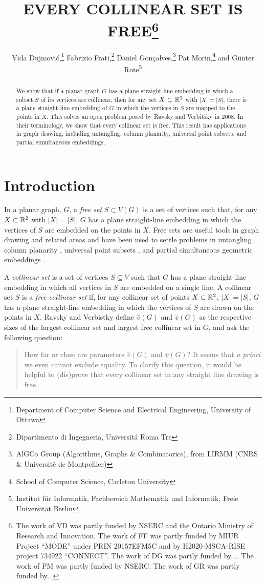 \documentclass{patmorin}
\title{\MakeUppercase{Every Collinear Set is Free}\thanks{%
The work of VD was partly funded by NSERC and the Ontario Ministry of Research and Innovation.
The work of FF was partly funded by MIUR Project “MODE” under PRIN 20157EFM5C and by H2020-MSCA-RISE project 734922 “CONNECT”.
The work of DG was partly funded by....
The work of PM was partly funded by NSERC.
The work of GR was partly funded by...
}}
\author{Vida Dujmović,\thanks{Department of Computer Science and Electrical Engineering, University of Ottawa}\quad
      Fabrizio Frati,\thanks{Dipartimento di Ingegneria,
Universit\'a Roma Tre}\quad
      Daniel Gonçalves,\thanks{AlGCo Group (Algorithms, Graphs \& Combinatorics), from LIRMM (CNRS \& Université de Montpellier)}\quad 
      Pat Morin,\thanks{School of Computer Science, Carleton University}\quad
      and Günter Rote\thanks{Institut für Informatik,
Fachbereich Mathematik und Informatik, 
Freie Universität Berlin}}
\begin{document}
\maketitle


\begin{abstract}
  We show that if a planar graph $G$ has a plane straight-line embedding
  in which a subset $S$ of its vertices are collinear, then for any set
  $X\subset\mathbb{R}^2$ with $|X|=|S|$, there is a plane straight-line
  embedding of $G$ in which the vertices in $S$ are mapped to the points
  in $X$.  This solves an open problem posed by Ravsky and Verbitsky in
  2008.  In their terminology, we show that every collinear set is free.
  This result has applications in graph drawing, including untangling,
  column planarity, universal point subsets, and partial simultaneous
  embeddings.
\end{abstract}


\section{Introduction}

In a planar graph, $G$, a \emph{free set} $S\subset V(G)$ is a set of
vertices such that, for any $X\subset\mathbb{R}^2$ with $|X|=|S|$, $G$ has a plane
straight-line embedding in which the vertices of $S$ are embedded
on the points in $X$.  Free sets are useful tools in graph drawing
and related areas and have been used to settle problems in untangling
\cite{X}, column planarity \cite{X}, universal point subsets \cite{X},
and partial simultaneous geometric embeddings \cite{X}.

A \emph{collinear set} is a set of vertices
$S\subseteq V$ such that $G$ has a plane straight-line embedding in which
all vertices in $S$ are embedded on a single line.  A collinear set $S$
is a \emph{free collinear set} if, for any collinear set of points
$X\subset\mathbb{R}^2$, $|X|=|S|$, $G$ has a plane straight-line embedding in
which the vertices of $S$ are drawn on the points in $X$.  
Ravsky and Verbistky \cite{ravsky.verbitsky:on,ravsky.verbitsky:on-arxiv}
define $\stackrel{\sim}{v}(G)$ and $\stackrel{-}{v}(G)$ as the respective sizes of the
largest collinear set and largest free collinear set in $G$, and ask
the following question:

\begin{quote}
   How far or close are parameters $\stackrel{\sim}{v}(G)$ and $\stackrel{-}{v}(G)$? It
   seems that \emph{a priori} we even cannot exclude equality. To clarify
   this question, it would be helpful to (dis)prove that every collinear
   set in any straight line drawing is free.
\end{quote}
\end{document}
